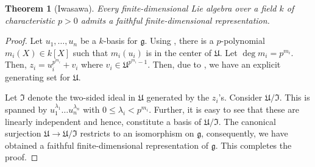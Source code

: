 \documentclass[12pt]{article}
\theoremstyle{thmstyle}
\newtheorem{theorem}{Theorem}[section]
\theoremstyle{defstyle}
\newcommand{\frakg}{\mathfrak{g}}
\newcommand{\frakI}{\mathfrak{I}}
\newcommand{\frakU}{\mathfrak{U}}
\renewcommand{\le}{\leqslant}
\begin{document}
\begin{theorem}[Iwasawa]
    Every finite-dimensional Lie algebra over a field $k$ of characteristic $p > 0$ admits a faithful finite-dimensional representation.
\end{theorem}
\begin{proof}
    Let $u_1,\dots,u_n$ be a $k$-basis for $\frakg$. Using , there is a $p$-polynomial $m_i(X)\in k[X]$ such that $m_i(u_i)$ is in the center of $\frakU$. Let $\deg m_i = p^{m_i}$. Then, $z_i = u_i^{p^{m_i}} + v_i$ where $v_i\in\frakU^{p^{m_i} - 1}$. Then, due to , we have an explicit generating set for $\frakU$.

    Let $\frakI$ denote the two-sided ideal in $\frakU$ generated by the $z_i$'s. Consider $\frakU/\frakI$. This is spanned by $u_1^{\lambda_1}\dots u_n^{\lambda_n}$ with $0\le\lambda_i < p^{m_i}$. Further, it is easy to see that these are linearly independent and hence, constitute a basis of $\frakU/\frakI$. The canonical surjection $\frakU\to\frakU/\frakI$ restricts to an isomorphism on $\frakg$, consequently, we have obtained a faithful finite-dimensional representation of $\frakg$. This completes the proof.
\end{proof}

\newpage


\end{document}
